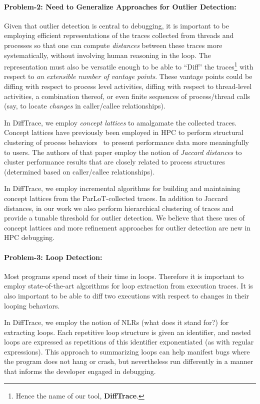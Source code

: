 \paragraph{Problem-2: Need to Generalize Approaches for Outlier Detection:\/}
Given that outlier detection is central to debugging,
it is important to be employing efficient representations of the traces
collected from threads and processes so that one can compute
{\em distances} between these traces more systematically, without
involving human reasoning in the loop.
%
The representation must also be versatile enough to
be able to ``Diff'' the traces\footnote{Hence the name of our tool, {\bf DiffTrace}.}
with respect to {\em an extensible number of vantage points}.
%
These vantage points could be diffing with respect to process level activities,
diffing with respect to thread-level activities, a combination thereof,
or even finite sequences of process/thread calls (say, to locate {\em changes}
in caller/callee relationships).


In DiffTrace, we employ {\em concept lattices} to amalgamate the collected traces.
%
Concept lattices have previously been employed in HPC to perform structural
clustering of process behaviors~\cite{weber-cl} to present performance data more
meaningfully to users.
%
The authors of that paper employ the notion of {\em Jaccard distances}
to cluster performance results that are closely related to process structures
(determined based on caller/callee relationships).


In DiffTrace, we employ incremental algorithms for building and maintaining
concept lattices from the ParLoT-collected traces.
%
In addition to Jaccard distances, in our work we also perform hierarchical
clustering of traces and provide a tunable threshold for outlier detection.
%
We believe that these uses of concept lattices and more refinement approaches
for outlier detection are new in HPC debugging.


\paragraph{Problem-3: Loop Detection:\/}
Most programs spend most of their time in loops.
%
Therefore it is important to employ state-of-the-art algorithms for
loop extraction from execution traces.
%
It is also important
to be able to diff two executions with respect to changes in their looping behaviors.

In DiffTrace, we employ the notion of NLRs (what does it stand for?) for
extracting loops.
%
Each repetitive loop structure is given an identifier, and nested loops are
expressed as repetitions of this identifier exponentiated (as with regular
expressions).
%
This approach to summarizing loops can help manifest
bugs where the program does not hang or crash, but nevertheless
run differently in a manner that informs the developer engaged in debugging.



